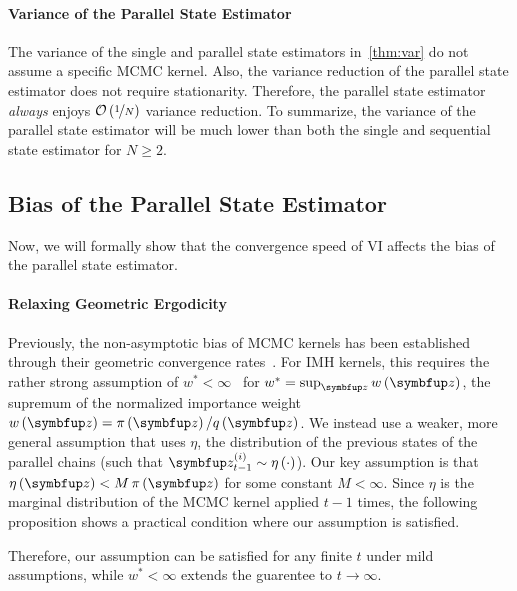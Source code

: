 \vspace{-0.05in}
\paragraph{Variance of the Parallel State Estimator}
The variance of the single and parallel state estimators in~\cref{thm:var} do not assume a specific MCMC kernel.
Also, the variance reduction of the parallel state estimator does not require stationarity.
Therefore, the parallel state estimator \textit{always} enjoys \(\mathcal{O}\left(\nicefrac{1}{N}\right)\) variance reduction.
To summarize, the variance of the parallel state estimator will be much lower than both the single and sequential state estimator for \(N \geq 2\).

\vspace{-0.05in}
\subsection{Bias of the Parallel State Estimator}\label{section:bias}
\vspace{-0.05in}
Now, we will formally show that the convergence speed of VI affects the bias of the parallel state estimator.

\vspace{-0.05in}
\paragraph{Relaxing Geometric Ergodicity}
Previously, the non-asymptotic bias of MCMC kernels has been established through their geometric convergence rates~\citep{jiang_mcmc_2021}.
For IMH kernels, this requires the rather strong assumption of \(w^* < \infty\)~\citep{10.2307/2242610, wang_exact_2020} for \(w^* = \sup_{\vz} w\left(\vz\right)\), the supremum of the normalized importance weight \(w\left(\vz\right) = \pi\left(\vz\right) / q\left(\vz\right)\).
We instead use a weaker, more general assumption that uses \(\eta\), the distribution of the previous states of the parallel chains (such that \(\vz^{(i)}_{t-1} \sim \eta\left(\cdot\right)\)).
Our key assumption is that \(\eta\left(\vz\right) < M\,\pi\left(\vz\right)\) for some constant \(M < \infty\).
Since \(\eta\) is the marginal distribution of the MCMC kernel applied \(t-1\) times, the following proposition shows a practical condition where our assumption is satisfied.



Therefore, our assumption can be satisfied for any finite \(t\) under mild assumptions, while \(w^* < \infty\) extends the guarentee to \(t \rightarrow \infty\).

